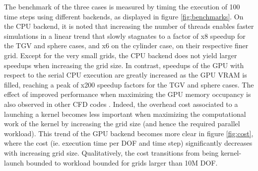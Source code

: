 \documentclass[final,3p,times]{elsarticle}
\begin{document}
The benchmark of the three cases is measured by timing the execution of 100 time steps using different backends, as displayed in figure \ref{fig:benchmarks}. On the CPU backend, it is noted that increasing the number of threads enables faster simulations in a linear trend that slowly stagnates to a factor of x8 speedup for the TGV and sphere cases, and x6 on the cylinder case, on their respective finer grid. Except for the very small grids, the CPU backend does not yield larger speedups when increasing the grid size. In contrast, speedups of the GPU with respect to the serial CPU execution are greatly increased as the GPU VRAM is filled, reaching a peak of x200 speedup factors for the TGV and sphere cases. The effect of improved performance when maximizing the GPU memory occupancy is also observed in other CFD codes \citep{Kempf2024}. Indeed, the overhead cost associated to a launching a kernel becomes less important when maximizing the computational work of the kernel by increasing the grid size (and hence the required parallel workload). This trend of the GPU backend becomes more clear in figure \ref{fig:cost}, where the cost (ie. execution time per DOF and time step) significantly decreases with increasing grid size. Qualitatively, the cost transitions from being kernel-launch bounded to workload bounded for grids larger than 10M DOF.
\end{document}
